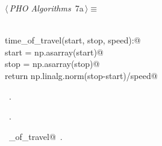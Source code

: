 \documentclass[10.0pt]{report}
\begin{document}
\begin{flushleft} \small
\begin{minipage}{\linewidth}\label{scrap2}\raggedright\small
{} $\langle\,${\itshape PHO Algorithms}\nobreak\ {\footnotesize {7a}}$\,\rangle\equiv$
\vspace{-1ex}
\begin{list}{}{} \item
\mbox{}\verb@@\\
\mbox{}\verb@def time_of_travel(start, stop, speed):@\\
\mbox{}\verb@     start = np.asarray(start)@\\
\mbox{}\verb@     stop  = np.asarray(stop)@\\
\mbox{}\verb@     return np.linalg.norm(stop-start)/speed@\\
\mbox{}\verb@@{\NWsep}
\end{list}
\vspace{-1.5ex}
\footnotesize
\begin{list}{}{\setlength{\itemsep}{-\parsep}\setlength{\itemindent}{-\leftmargin}}
\item \NWtxtMacroDefBy\ .
\item \NWtxtMacroRefIn\ .
\item \NWtxtIdentsDefed\nobreak\  \verb@time_of_travel@\nobreak\ .
\item{}
\end{list}
\end{minipage}\vspace{4ex}
\end{flushleft}
\end{document}
